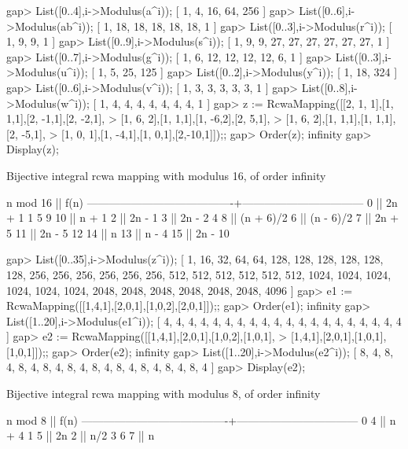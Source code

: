 \beginexample
gap> List([0..4],i->Modulus(a^i));
[ 1, 4, 16, 64, 256 ]
gap> List([0..6],i->Modulus(ab^i));
[ 1, 18, 18, 18, 18, 18, 1 ]
gap> List([0..3],i->Modulus(r^i));
[ 1, 9, 9, 1 ]
gap> List([0..9],i->Modulus(s^i));
[ 1, 9, 9, 27, 27, 27, 27, 27, 27, 1 ]
gap> List([0..7],i->Modulus(g^i));
[ 1, 6, 12, 12, 12, 12, 6, 1 ]
gap> List([0..3],i->Modulus(u^i));
[ 1, 5, 25, 125 ]
gap> List([0..2],i->Modulus(y^i));
[ 1, 18, 324 ]
gap> List([0..6],i->Modulus(v^i));
[ 1, 3, 3, 3, 3, 3, 1 ]
gap> List([0..8],i->Modulus(w^i));
[ 1, 4, 4, 4, 4, 4, 4, 4, 1 ]
gap> z := RcwaMapping([[2,  1, 1],[1,  1,1],[2, -1,1],[2, -2,1],
>                      [1,  6, 2],[1,  1,1],[1, -6,2],[2,  5,1],
>                      [1,  6, 2],[1,  1,1],[1,  1,1],[2, -5,1],
>                      [1,  0, 1],[1, -4,1],[1,  0,1],[2,-10,1]]);;
gap> Order(z);
infinity
gap> Display(z);

Bijective integral rcwa mapping with modulus 16, of order infinity

               n mod 16                 ||              f(n)              
----------------------------------------+---------------------------------
   0                                    || 2n + 1
   1  5  9 10                           || n + 1
   2                                    || 2n - 1
   3                                    || 2n - 2
   4  8                                 || (n + 6)/2
   6                                    || (n - 6)/2
   7                                    || 2n + 5
  11                                    || 2n - 5
  12 14                                 || n
  13                                    || n - 4
  15                                    || 2n - 10

gap> List([0..35],i->Modulus(z^i));
[ 1, 16, 32, 64, 64, 128, 128, 128, 128, 128, 128, 256, 256, 256, 256, 256, 
  256, 512, 512, 512, 512, 512, 512, 1024, 1024, 1024, 1024, 1024, 1024, 
  2048, 2048, 2048, 2048, 2048, 2048, 4096 ]
gap> e1 := RcwaMapping([[1,4,1],[2,0,1],[1,0,2],[2,0,1]]);;
gap> Order(e1);
infinity
gap> List([1..20],i->Modulus(e1^i));
[ 4, 4, 4, 4, 4, 4, 4, 4, 4, 4, 4, 4, 4, 4, 4, 4, 4, 4, 4, 4 ]
gap> e2 := RcwaMapping([[1,4,1],[2,0,1],[1,0,2],[1,0,1],
>                       [1,4,1],[2,0,1],[1,0,1],[1,0,1]]);;
gap> Order(e2);
infinity
gap> List([1..20],i->Modulus(e2^i));
[ 8, 4, 8, 4, 8, 4, 8, 4, 8, 4, 8, 4, 8, 4, 8, 4, 8, 4, 8, 4 ]
gap> Display(e2);

Bijective integral rcwa mapping with modulus 8, of order infinity

               n mod 8                  ||              f(n)              
----------------------------------------+---------------------------------
  0 4                                   || n + 4
  1 5                                   || 2n
  2                                     || n/2
  3 6 7                                 || n

